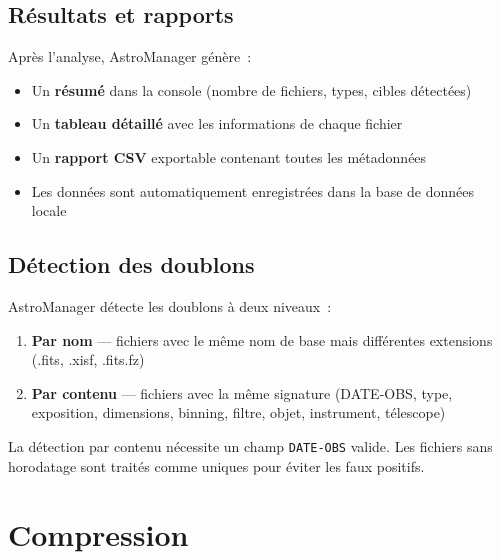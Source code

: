 \documentclass[a4paper,11pt]{article}
\begin{document}
\subsection{R\'{e}sultats et rapports}

Apr\`{e}s l'analyse, AstroManager g\'{e}n\`{e}re~:

\begin{itemize}
    \item Un \textbf{r\'{e}sum\'{e}} dans la console (nombre de fichiers, types, cibles d\'{e}tect\'{e}es)
    \item Un \textbf{tableau d\'{e}taill\'{e}} avec les informations de chaque fichier
    \item Un \textbf{rapport CSV} exportable contenant toutes les m\'{e}tadonn\'{e}es
    \item Les donn\'{e}es sont automatiquement enregistr\'{e}es dans la base de donn\'{e}es locale
\end{itemize}

\subsection{D\'{e}tection des doublons}

AstroManager d\'{e}tecte les doublons \`{a} deux niveaux~:

\begin{enumerate}
    \item \textbf{Par nom} --- fichiers avec le m\^{e}me nom de base mais diff\'{e}rentes extensions (.fits, .xisf, .fits.fz)
    \item \textbf{Par contenu} --- fichiers avec la m\^{e}me signature (DATE-OBS, type, exposition, dimensions, binning, filtre, objet, instrument, t\'{e}lescope)
\end{enumerate}

\begin{warningbox}
La d\'{e}tection par contenu n\'{e}cessite un champ \texttt{DATE-OBS} valide. Les fichiers sans horodatage sont trait\'{e}s comme uniques pour \'{e}viter les faux positifs.
\end{warningbox}


\section{Compression}
\label{sec:compression}
\end{document}
